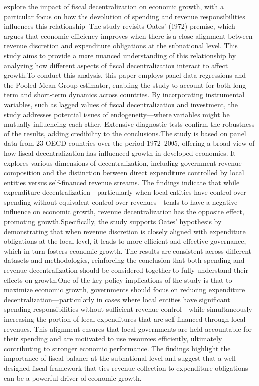   explore the impact of fiscal decentralization on economic growth, with a particular focus on how the devolution of spending and revenue responsibilities influences this relationship. The study revisits Oates' (1972) premise, which argues that economic efficiency improves when there is a close alignment between revenue discretion and expenditure obligations at the subnational level. This study aims to provide a more nuanced understanding of this relationship by analyzing how different aspects of fiscal decentralization interact to affect growth.To conduct this analysis, this paper employs panel data regressions and the Pooled Mean Group estimator, enabling the study to account for both long-term and short-term dynamics across countries. By incorporating instrumental variables, such as lagged values of fiscal decentralization and investment, the study addresses potential issues of endogeneity—where variables might be mutually influencing each other. Extensive diagnostic tests confirm the robustness of the results, adding credibility to the conclusions.The study is based on panel data from 23 OECD countries over the period 1972–2005, offering a broad view of how fiscal decentralization has influenced growth in developed economies. It explores various dimensions of decentralization, including government revenue composition and the distinction between direct expenditure controlled by local entities versus self-financed revenue streams. The findings indicate that while expenditure decentralization—particularly when local entities have control over spending without equivalent control over revenues—tends to have a negative influence on economic growth, revenue decentralization has the opposite effect, promoting growth.Specifically, the study supports Oates' hypothesis by demonstrating that when revenue discretion is closely aligned with expenditure obligations at the local level, it leads to more efficient and effective governance, which in turn fosters economic growth. The results are consistent across different datasets and methodologies, reinforcing the conclusion that both spending and revenue decentralization should be considered together to fully understand their effects on growth.One of the key policy implications of the study is that to maximize economic growth, governments should focus on reducing expenditure decentralization—particularly in cases where local entities have significant spending responsibilities without sufficient revenue control—while simultaneously increasing the portion of local expenditures that are self-financed through local revenues. This alignment ensures that local governments are held accountable for their spending and are motivated to use resources efficiently, ultimately contributing to stronger economic performance. The findings highlight the importance of fiscal balance at the subnational level and suggest that a well-designed fiscal framework that ties revenue collection to expenditure obligations can be a powerful driver of economic growth.\par
